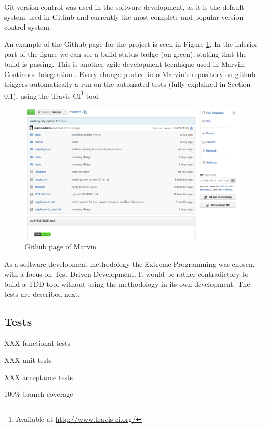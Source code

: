\documentclass{report}
\begin{document}
Git version control was used in the software development, as it is the
default system used in Github and currently the most complete and popular version control system.

An example of the Github page for the project is seen in Figure \ref{figGithub}. In the inferior part of the figure we can see a build status badge (on green), stating that the build is passing. This is another agile development tecnhique used in Marvin: Continuos Integration \cite{beck04}. Every change pushed into Marvin's repository on github triggers automatically a run on the automated tests (fully explained in Section \ref{tests}), using the Travis CI\footnote{Available at \url{http://www.travis-ci.org/}} tool.

\begin{figure}[!hbt]
    \centering
    \label{figGithub}
    \caption{Github page of Marvin}
    \includegraphics[scale=0.4]{fig/github.png}
\end{figure}

As a software development methodology the Extreme Programming \cite{beck04} was chosen, with a focus on Test Driven
Development. It would be rather contradictory to build a TDD tool without using the methodology in its own development.
The tests are described next.

\subsection{Tests}
\label{tests}


XXX functional tests

XXX unit tests

XXX acceptance tests

100\% branch coverage
\end{document}
